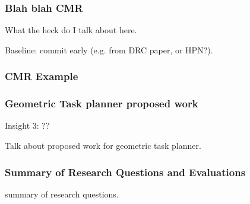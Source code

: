 \documentclass[serif]{beamer}
\def\gridopacity{100}
\begin{document}
\begin{frame}
   \frametitle{Blah blah CMR}
   
   What the heck do I talk about here.
   
   Baseline: commit early (e.g. from DRC paper, or HPN?).
   
\end{frame}

\begin{frame}
   \frametitle{CMR Example}
\end{frame}

\begin{frame}
   \frametitle{Geometric Task planner proposed work}
   
   Insight 3: ??
   
   Talk about proposed work for geometric task planner.
   
\end{frame}

\begin{frame}
   \frametitle{Summary of Research Questions and Evaluations}
   
   summary of research questions.
   
\end{frame}
\end{document}
